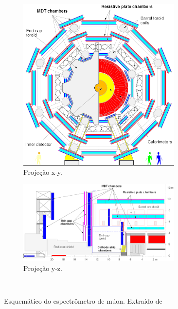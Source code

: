 \begin{figure}[htpb!]
    \centering
    \begin{subfigure}[b]{\textwidth}
        \centering
        \includegraphics[width=0.9\textwidth]{images/ATLAS-muon-xy-tdr.png}
        \caption{Projeção x-y.}
        \label{fig:muonspecxy}
    \end{subfigure}
    \begin{subfigure}[b]{\textwidth}
        \centering
        \includegraphics[width=0.9\textwidth]{images/ATLAS-muon-rz-tdr.png}
        \caption{Projeção y-z.}
        \label{fig:muonspecyz}
    \end{subfigure}~\\%
    \caption[Visualização gráfica do Espectrômetro de múons.]{Esquemático do
    espectrômetro de múon. Extraído de~\cite{MUONTDR1997}}
    \label{fig:muonspec}
\end{figure}

